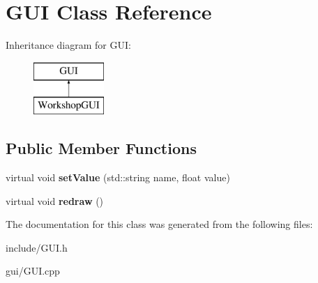 \hypertarget{classGUI}{}\section{G\+UI Class Reference}
\label{classGUI}
Inheritance diagram for G\+UI\+:\begin{figure}[H]
\begin{center}
\leavevmode
\includegraphics[height=2.000000cm]{classGUI}
\end{center}
\end{figure}
\subsection*{Public Member Functions}
\begin{DoxyCompactItemize}
\item 
virtual void {\bfseries set\+Value} (std\+::string name, float value)\hypertarget{classGUI_ac7565b952201756e1dc1f0b9486f6b28}{}\label{classGUI_ac7565b952201756e1dc1f0b9486f6b28}

\item 
virtual void {\bfseries redraw} ()\hypertarget{classGUI_a86c7f4b8bd81b4c0e191b40a134e2f9e}{}\label{classGUI_a86c7f4b8bd81b4c0e191b40a134e2f9e}

\end{DoxyCompactItemize}


The documentation for this class was generated from the following files\+:\begin{DoxyCompactItemize}
\item 
include/G\+U\+I.\+h\item 
gui/G\+U\+I.\+cpp\end{DoxyCompactItemize}
